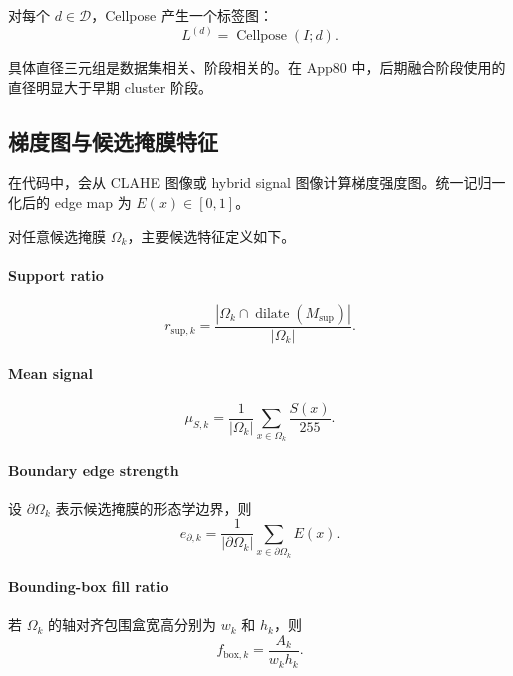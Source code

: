 \documentclass[11pt]{article}
\newcommand{\1}{\mathbf{1}}
\newcommand{\dilate}{\operatorname{dilate}}
\newcommand{\support}{M_{\mathrm{sup}}}
\newcommand{\edgefield}{E}
\newcommand{\signal}{S}
\newcommand{\gray}{I}
\newcommand{\labelmap}{L}
\begin{document}
对每个 $d \in \mathcal{D}$，Cellpose 产生一个标签图：
\begin{equation}
\labelmap^{(d)} = \operatorname{Cellpose}(\gray; d).
\end{equation}

具体直径三元组是数据集相关、阶段相关的。在 App80 中，后期融合阶段使用的直径明显大于早期 cluster 阶段。

\subsection{梯度图与候选掩膜特征}
在代码中，会从 CLAHE 图像或 hybrid signal 图像计算梯度强度图。统一记归一化后的 edge map 为 $\edgefield(x)\in[0,1]$。

对任意候选掩膜 $\Omega_k$，主要候选特征定义如下。

\paragraph{Support ratio}
\begin{equation}
r_{\mathrm{sup},k} = \frac{|\Omega_k \cap \dilate(\support)|}{|\Omega_k|}.
\end{equation}

\paragraph{Mean signal}
\begin{equation}
\mu_{\signal,k} = \frac{1}{|\Omega_k|}\sum_{x\in\Omega_k} \frac{\signal(x)}{255}.
\end{equation}

\paragraph{Boundary edge strength}
设 $\partial \Omega_k$ 表示候选掩膜的形态学边界，则
\begin{equation}
e_{\partial,k} = \frac{1}{|\partial \Omega_k|}\sum_{x\in\partial \Omega_k} \edgefield(x).
\end{equation}

\paragraph{Bounding-box fill ratio}
若 $\Omega_k$ 的轴对齐包围盒宽高分别为 $w_k$ 和 $h_k$，则
\begin{equation}
f_{\mathrm{box},k} = \frac{A_k}{w_k h_k}.
\end{equation}
\end{document}
